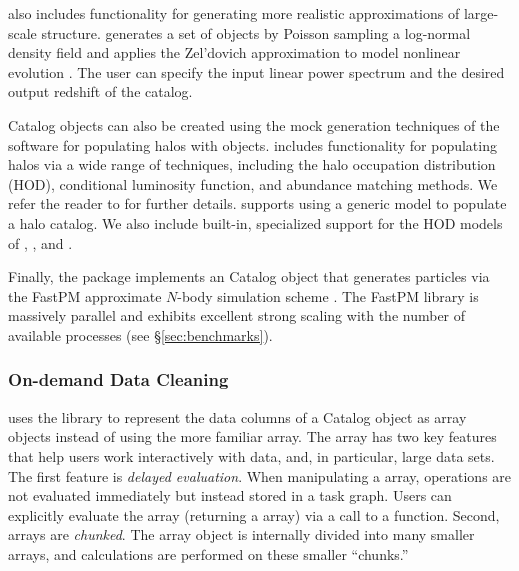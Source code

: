 \nbkit{} also includes functionality for generating more
realistic approximations of large-scale structure. 
generates a set of objects by Poisson sampling a log-normal density field and
applies the Zel’dovich approximation to model nonlinear evolution
\citep{Cole:1991,Agrawal:2017}. The user can specify the input linear power
spectrum and the desired output redshift of the catalog.

Catalog objects can also be created using the mock generation techniques
of the \halotools{} software \citep{Hearin:2017} for populating halos with
objects. \halotools{} includes functionality for populating halos via a wide
range of techniques, including the halo occupation distribution (HOD),
conditional luminosity function, and abundance matching methods. We refer the
reader to \citet{Hearin:2017} for further details. \nbkit{} supports
using a generic \halotools{} model to populate a halo catalog. We also
include built-in, specialized support for the HOD models of
\citet{Zheng:2007}, \citet{Leauthaud:2011}, and \citet{Hearin:2016}.

Finally, the \fastpm{} package implements an \nbkit{} Catalog object
that generates particles via the FastPM approximate $N$-body simulation
scheme \citep{Feng:2016b}. The FastPM library is
massively parallel and exhibits excellent strong scaling with the number of
available processes (see \S\ref{sec:benchmarks}).


\subsubsection{On-demand Data Cleaning}

\nbkit{} uses the \dask{} library \citep{dask}
to represent the data columns of a Catalog object as \dask{} array objects
instead of using the more familiar \numpy{} array. The \dask{} array has two
key features that help users work interactively with data, and, in particular,
large data sets. The first feature is \textit{delayed evaluation}.
When manipulating a \dask{} array, operations are not evaluated
immediately but instead stored in a task graph.
Users can explicitly evaluate the \dask{} array (returning a \numpy{}
array) via a call to a  function.
Second, \dask{} arrays are \textit{chunked}. The array object is internally
divided into many smaller arrays, and calculations are performed on
these smaller ``chunks.''

